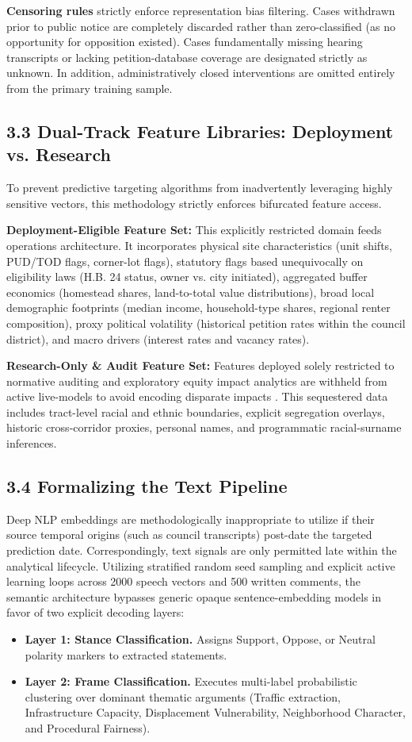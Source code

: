 \textbf{Censoring rules} strictly enforce representation bias filtering. Cases withdrawn prior to public notice are completely discarded rather than zero-classified (as no opportunity for opposition existed). Cases fundamentally missing hearing transcripts or lacking petition-database coverage are designated strictly as unknown. In addition, administratively closed interventions are omitted entirely from the primary training sample.

\subsection*{3.3 Dual-Track Feature Libraries: Deployment vs. Research}
To prevent predictive targeting algorithms from inadvertently leveraging highly sensitive vectors, this methodology strictly enforces bifurcated feature access.

\textbf{Deployment-Eligible Feature Set:} This explicitly restricted domain feeds operations architecture. It incorporates physical site characteristics (unit shifts, PUD/TOD flags, corner-lot flags), statutory flags based unequivocally on eligibility laws (H.B. 24 status, owner vs. city initiated), aggregated buffer economics (homestead shares, land-to-total value distributions), broad local demographic footprints (median income, household-type shares, regional renter composition), proxy political volatility (historical petition rates within the council district), and macro drivers (interest rates and vacancy rates).

\textbf{Research-Only \& Audit Feature Set:} Features deployed solely restricted to normative auditing and exploratory equity impact analytics are withheld from active live-models to avoid encoding disparate impacts \cite{barocas2016}. This sequestered data includes tract-level racial and ethnic boundaries, explicit segregation overlays, historic cross-corridor proxies, personal names, and programmatic racial-surname inferences. 

\subsection*{3.4 Formalizing the Text Pipeline}
Deep NLP embeddings are methodologically inappropriate to utilize if their source temporal origins (such as council transcripts) post-date the targeted prediction date. Correspondingly, text signals are only permitted late within the analytical lifecycle. Utilizing stratified random seed sampling and explicit active learning loops across 2000 speech vectors and 500 written comments, the semantic architecture bypasses generic opaque sentence-embedding models in favor of two explicit decoding layers:
\begin{itemize}
 \item \textbf{Layer 1: Stance Classification.} Assigns Support, Oppose, or Neutral polarity markers to extracted statements.
 \item \textbf{Layer 2: Frame Classification.} Executes multi-label probabilistic clustering over dominant thematic arguments (Traffic extraction, Infrastructure Capacity, Displacement Vulnerability, Neighborhood Character, and Procedural Fairness).
\end{itemize}

